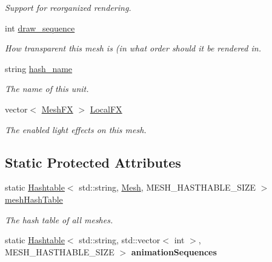 \begin{DoxyCompactItemize}
\begin{DoxyCompactList}\small\item\em Support for reorganized rendering. \end{DoxyCompactList}\item 
int \hyperlink{classMesh_ad02b0fbca5c35d6ce393718144b69471}{draw\+\_\+sequence}\hypertarget{classMesh_ad02b0fbca5c35d6ce393718144b69471}{}\label{classMesh_ad02b0fbca5c35d6ce393718144b69471}

\begin{DoxyCompactList}\small\item\em How transparent this mesh is (in what order should it be rendered in. \end{DoxyCompactList}\item 
string \hyperlink{classMesh_a1e30f4793443788927376dd02d7bb918}{hash\+\_\+name}\hypertarget{classMesh_a1e30f4793443788927376dd02d7bb918}{}\label{classMesh_a1e30f4793443788927376dd02d7bb918}

\begin{DoxyCompactList}\small\item\em The name of this unit. \end{DoxyCompactList}\item 
vector$<$ \hyperlink{classMeshFX}{Mesh\+FX} $>$ \hyperlink{classMesh_afd4993fb8b0b73ee60b289c104523d0b}{Local\+FX}\hypertarget{classMesh_afd4993fb8b0b73ee60b289c104523d0b}{}\label{classMesh_afd4993fb8b0b73ee60b289c104523d0b}

\begin{DoxyCompactList}\small\item\em The enabled light effects on this mesh. \end{DoxyCompactList}\end{DoxyCompactItemize}
\subsection*{Static Protected Attributes}
\begin{DoxyCompactItemize}
\item 
static \hyperlink{classHashtable}{Hashtable}$<$ std\+::string, \hyperlink{classMesh}{Mesh}, M\+E\+S\+H\+\_\+\+H\+A\+S\+T\+H\+A\+B\+L\+E\+\_\+\+S\+I\+ZE $>$ \hyperlink{classMesh_adc41b8516003b201e86722f66f50b0e8}{mesh\+Hash\+Table}\hypertarget{classMesh_adc41b8516003b201e86722f66f50b0e8}{}\label{classMesh_adc41b8516003b201e86722f66f50b0e8}

\begin{DoxyCompactList}\small\item\em The hash table of all meshes. \end{DoxyCompactList}\item 
static \hyperlink{classHashtable}{Hashtable}$<$ std\+::string, std\+::vector$<$ int $>$, M\+E\+S\+H\+\_\+\+H\+A\+S\+T\+H\+A\+B\+L\+E\+\_\+\+S\+I\+ZE $>$ {\bfseries animation\+Sequences}\hypertarget{classMesh_aa1f5595b1cfa3bd0853a1c5488c1034d}{}\label{classMesh_aa1f5595b1cfa3bd0853a1c5488c1034d}

\end{DoxyCompactItemize}
